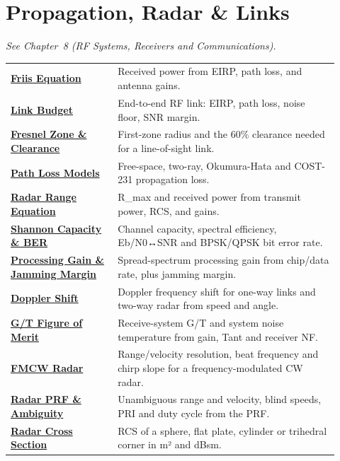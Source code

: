 \section*{Propagation, Radar \& Links}
\noindent\emph{See Chapter~8 (RF Systems, Receivers and Communications).}
\begin{longtable}{>{\raggedright\arraybackslash}p{0.30\linewidth}>{\raggedright\arraybackslash}p{0.62\linewidth}}
\hline
\href{https://rftoolbox.ca/Friis.html}{\textbf{Friis Equation}} & Received power from EIRP, path loss, and antenna gains. \\
\href{https://rftoolbox.ca/LinkBudget.html}{\textbf{Link Budget}} & End-to-end RF link: EIRP, path loss, noise floor, SNR margin. \\
\href{https://rftoolbox.ca/FresnelZone.html}{\textbf{Fresnel Zone \& Clearance}} & First-zone radius and the 60\% clearance needed for a line-of-sight link. \\
\href{https://rftoolbox.ca/PathLoss.html}{\textbf{Path Loss Models}} & Free-space, two-ray, Okumura-Hata and COST-231 propagation loss. \\
\href{https://rftoolbox.ca/RadarRange.html}{\textbf{Radar Range Equation}} & R\_max and received power from transmit power, RCS, and gains. \\
\href{https://rftoolbox.ca/LinkCapacity.html}{\textbf{Shannon Capacity \& BER}} & Channel capacity, spectral efficiency, Eb/N0↔SNR and BPSK/QPSK bit error rate. \\
\href{https://rftoolbox.ca/ProcessingGain.html}{\textbf{Processing Gain \& Jamming Margin}} & Spread-spectrum processing gain from chip/data rate, plus jamming margin. \\
\href{https://rftoolbox.ca/Doppler.html}{\textbf{Doppler Shift}} & Doppler frequency shift for one-way links and two-way radar from speed and angle. \\
\href{https://rftoolbox.ca/GT.html}{\textbf{G/T Figure of Merit}} & Receive-system G/T and system noise temperature from gain, Tant and receiver NF. \\
\href{https://rftoolbox.ca/FMCWRadar.html}{\textbf{FMCW Radar}} & Range/velocity resolution, beat frequency and chirp slope for a frequency-modulated CW radar. \\
\href{https://rftoolbox.ca/RadarPRF.html}{\textbf{Radar PRF \& Ambiguity}} & Unambiguous range and velocity, blind speeds, PRI and duty cycle from the PRF. \\
\href{https://rftoolbox.ca/RCS.html}{\textbf{Radar Cross Section}} & RCS of a sphere, flat plate, cylinder or trihedral corner in m² and dBsm. \\
\hline
\end{longtable}

